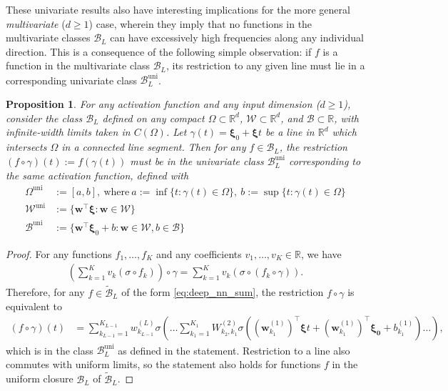 \documentclass{article}
\def\vw{{\bm{w}}}
\def\cB{{\mathcal{B}}}
\def\cW{{\mathcal{W}}}
\newcommand{\R}{\mathbb{R}}
\newtheorem{proposition}[theorem]{Proposition}
\begin{document}
These univariate results also have interesting implications for the more general \textit{multivariate} ($d \geq 1$) case, wherein they imply that no functions in the multivariate classes $\cB_L$ can have excessively high frequencies along any individual direction. This is a consequence of the following simple observation: if $f$ is a function in the multivariate class $\cB_L$, its restriction to any given line must lie in a corresponding univariate class $\cB_L^{\textrm{uni}}$.

\begin{proposition} \label{prop:line_restriction}
    For any activation function and any input dimension ($d \geq 1$), consider the class $\cB_L$ defined on any compact $\Omega \subset \R^d$, $\cW \subset \R^d$, and $\cB \subset \R$, with infinite-width limits taken in $C(\Omega)$. Let $\gamma(t) = \boldsymbol{\xi}_0 + \boldsymbol{\xi} t$ be a line in $\R^d$ which intersects $\Omega$ in a connected line segment. Then for any $f \in \cB_L$, the restriction $(f \circ \gamma)(t) := f(\gamma(t))$ must be in the univariate class $\cB_L^{\mathrm{uni}}$ corresponding to the same activation function, defined with
    \begin{align}
        \Omega^{\mathrm{uni}} &:= [a,b], \  \mathrm{where} \ a := \inf\{ t: \gamma(t) \in \Omega \}, \ b := \sup \{ t: \gamma(t) \in \Omega \}  \\
        \cW^{\mathrm{uni}} &:= \{ \vw^\top \boldsymbol{\xi}: \vw \in \cW \} \\
        \cB^{\mathrm{uni}} &:= \{ \vw^\top \boldsymbol{\xi}_0+ b: \vw \in \cW, b \in \cB \}
    \end{align}
\end{proposition} 
\begin{proof}
    For any functions $f_1, \dots, f_K$ and any coefficients $v_1, \dots, v_K \in \R$, we have
    \begin{align} \label{eq:aconv_restrict}
        \left( \sum_{k=1}^K v_k (\sigma \circ f_k) \right) \circ \gamma = \sum_{k=1}^K v_k (\sigma \circ (f_k \circ \gamma)).
    \end{align}
    Therefore, for any $f \in \widetilde{\cB}_L$ of the form \eqref{eq:deep_nn_sum}, the restriction $f \circ \gamma$ is equivalent to
    \begin{align} \label{eq:deep_nn_sum_restricted}
        (f \circ \gamma)(t) &= \sum_{k_{L-1}=1}^{K_{L-1}} w_{k_{L-1}}^{(L)} \sigma \left(  \dots \sum_{k_1=1}^{K_1} W_{k_2, k_1}^{(2)} \sigma \left( ( \vw_{k_1}^{(1)} )^\top \boldsymbol{\xi} t + ( \vw_{k_1}^{(1)} )^\top \boldsymbol{\xi_0} + b_{k_1}^{(1)}  \right) \dots  \right),
    \end{align}
    which is in the class $\cB_L^{\mathrm{uni}}$ as defined in the statement. Restriction to a line also commutes with uniform limits, so the statement also holds for functions $f$ in the uniform closure $\cB_L$ of $\widetilde{\cB}_L$.
\end{proof}
\end{document}
